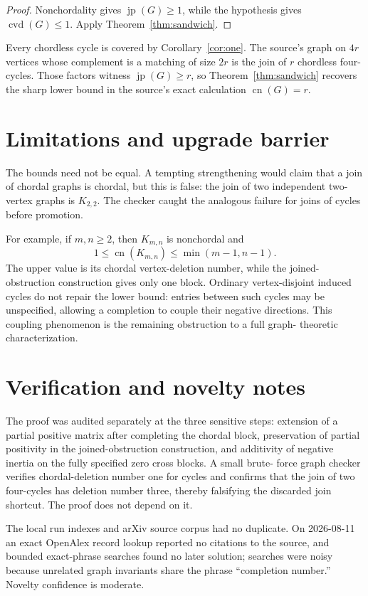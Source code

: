 \documentclass[11pt]{amsart}
\newcommand{\cn}{\operatorname{cn}}
\newcommand{\cvd}{\operatorname{cvd}}
\newcommand{\jp}{\operatorname{jp}}
\begin{document}
\begin{proof}
Nonchordality gives $\jp(G)\geq1$, while the hypothesis gives
$\cvd(G)\leq1$. Apply Theorem~\ref{thm:sandwich}.
\end{proof}

Every chordless cycle is covered by Corollary~\ref{cor:one}.  The source's
graph on $4r$ vertices whose complement is a matching of size $2r$ is the
join of $r$ chordless four-cycles.  Those factors witness $\jp(G)\geq r$, so
Theorem~\ref{thm:sandwich} recovers the sharp lower bound in the source's
exact calculation $\cn(G)=r$.

\section*{Limitations and upgrade barrier}

The bounds need not be equal.  A tempting strengthening would claim that a
join of chordal graphs is chordal, but this is false: the join of two
independent two-vertex graphs is $K_{2,2}$.  The checker caught the analogous
failure for joins of cycles before promotion.

For example, if $m,n\geq2$, then
$K_{m,n}$ is nonchordal and
\[
 1\leq\cn(K_{m,n})\leq\min(m-1,n-1).
\]
The upper value is its chordal vertex-deletion number, while the joined-
obstruction construction gives only one block.  Ordinary vertex-disjoint
induced cycles do not repair the lower bound: entries between such cycles may
be unspecified, allowing a completion to couple their negative directions.
This coupling phenomenon is the remaining obstruction to a full graph-
theoretic characterization.

\section*{Verification and novelty notes}

The proof was audited separately at the three sensitive steps: extension of a
partial positive matrix after completing the chordal block, preservation of
partial positivity in the joined-obstruction construction, and additivity of
negative inertia on the fully specified zero cross blocks.  A small brute-
force graph checker verifies chordal-deletion number one for cycles and
confirms that the join of two four-cycles has deletion number three, thereby
falsifying the discarded join shortcut.  The proof does not depend on it.

The local run indexes and arXiv source corpus had no duplicate.  On
2026-08-11 an exact OpenAlex record lookup reported no citations to the source,
and bounded exact-phrase searches found no later solution; searches were noisy
because unrelated graph invariants share the phrase ``completion number.''
Novelty confidence is moderate.
\end{document}
